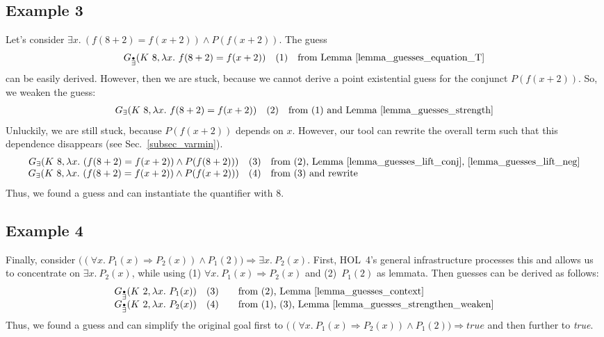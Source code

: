 \documentclass[a4paper,12pt,DIV=12,oneside]{scrbook}
\theoremstyle{definition}
\theoremstyle{remark}
\newcommand{\GE}{\ensuremath{G_\exists}}
\newcommand{\GEP}{\ensuremath{G_{\accentset{\bullet}{\exists}}}}
\begin{document}
\subsection{Example 3}
Let's consider $\exists x.\ (f (8 + 2) = f (x + 2)) \wedge P (f (x + 2))$. The guess
\[\begin{array}{cc@{\quad}l}
\GEP(K\ 8, \lambda x.\ f (8 + 2) = f (x + 2)) & \text{(1)} & \text{from Lemma~\ref{lemma_guesses_equation_T}} \\
\end{array}
\]
can be easily derived. However, then we are stuck, because we cannot derive a point existential guess for the conjunct $P (f (x + 2))$.
So, we weaken the guess:
\[\begin{array}{cc@{\quad}l}
\GE(K\ 8, \lambda x.\ f (8 + 2) = f (x + 2)) & \text{(2)} & \text{from (1) and Lemma~\ref{lemma_guesses_strength}} \\
\end{array}
\]
Unluckily, we are still stuck, because $P (f (x + 2))$ depends on $x$. However, our tool can rewrite the overall term
such that this dependence disappears (see Sec.~\ref{subsec_varmin}).
\[\begin{array}{cc@{\quad}l}
\GE(K\ 8, \lambda x.\ (f (8 + 2) = f (x + 2)) \wedge P(f(8 + 2))) & \text{(3)} & \text{from (2), Lemma~\ref{lemma_guesses_lift_conj},
\ref{lemma_guesses_lift_neg}} \\
\GE(K\ 8, \lambda x.\ (f (8 + 2) = f (x + 2)) \wedge P(f(x + 2))) & \text{(4)} & \text{from (3) and rewrite}
\end{array}
\]
Thus, we found a guess and can instantiate the quantifier with 8.

\subsection{Example 4}
Finally, consider $\big((\forall x.\ P_1(x) \Rightarrow P_2(x)) \wedge P_1(2)\big) \Longrightarrow \exists x.\ P_2(x)$.
First, HOL~4's general infrastructure processes this and allows us to concentrate on
$\exists x.\ P_2(x)$, while using (1) $\forall x.\ P_1(x) \Rightarrow P_2(x)$ and (2)~$P_1(2)$ as lemmata.
Then guesses can be derived as follows:
\[\begin{array}{cc@{\qquad}l}
\GEP(K\ 2, \lambda x.\ P_1(x)) & \text{(3)} & \text{from (2), Lemma~\ref{lemma_guesses_context}} \\
\GEP(K\ 2, \lambda x.\ P_2(x)) & \text{(4)} & \text{from (1), (3), Lemma~\ref{lemma_guesses_strengthen_weaken}}
\end{array}
\]
Thus, we found a guess and can simplify the original goal first to
$\big((\forall x.\ P_1(x) \Rightarrow P_2(x)) \wedge P_1(2)\big) \Longrightarrow \textit{true}$ and then further to
\textit{true}.
\end{document}
